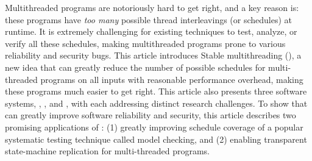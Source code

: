 Multithreaded programs are notoriously hard to get right, and a key reason is:
these programs have \emph{too many} possible thread interleavings (or
schedules) at runtime. It is extremely challenging for existing techniques to
test, analyze, or verify all these schedules, making multithreaded programs
prone to various reliability and security bugs. This article introduces
 Stable multithreading (\smt), a new idea that can greatly
 reduce the number of possible schedules for multi-threaded programs on all
 inputs with reasonable performance overhead, making
 these programs much easier to get right. This article also presents three
 \smt software systems, \tern, \peregrine, and \parrot, with each addressing
 distinct research challenges. To show that \smt can greatly improve software
 reliability and security, this article describes two promising applications of \smt:
 (1) greatly improving schedule coverage of a popular systematic testing technique
 called model checking, and  (2) enabling transparent state-machine replication for multi-threaded programs.
